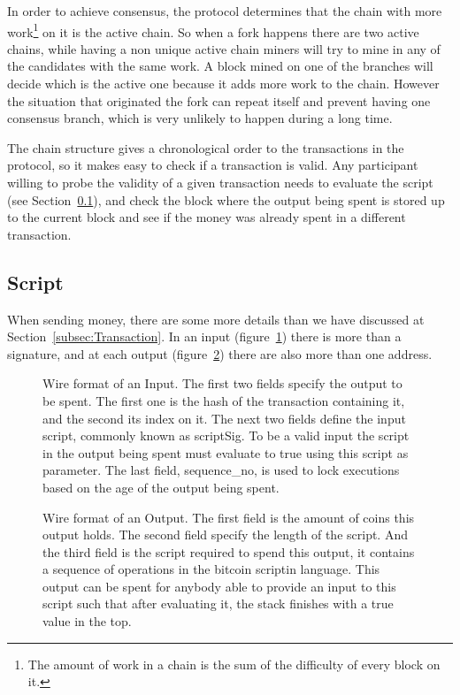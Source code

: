 In order to achieve consensus, the protocol determines that the chain with
  more work\footnote{The amount of work in a chain is the sum of the difficulty
  of every block on it.} on it is the active chain.
So when a fork happens there are two active chains, while having a non unique
  active chain miners will try to mine in any of the candidates with the same
  work.
A block mined on one of the branches will decide which is the active one
  because it adds more work to the chain. However the situation that originated
  the fork can repeat itself and prevent having one consensus branch, which is
  very unlikely \cite{decker2013information} to happen during a long time.

The chain structure gives a chronological order to the transactions in the
  protocol, so it makes easy to check if a transaction is valid.
Any participant willing to probe the validity of a given transaction needs
  to evaluate the script (see Section~\ref{subsec:script}), and  check the block
  where the output being spent is stored up to the current block and see if the
  money was already spent in a different transaction.

  \subsection{Script} \label{subsec:script}

When sending money, there are some more details than we have discussed at
  Section~\ref{subsec:Transaction}. In an input (figure~\ref{fig:input}) there
  is more than a signature, and at each output (figure~\ref{fig:output}) there
  are also more than one address.

\begin{figure}[ht]
  \centering
  
  \caption{Wire format of an Input.
             The first two fields specify the output to be spent.
             The first one is the hash of the transaction containing it, and the
               second its index on it.
             The next two fields define the input script, commonly known as
               scriptSig.
             To be a valid input the script in the output being spent must
               evaluate to true using this script as parameter.
             The last field, sequence\_no, is used to lock executions based on
             the age of the output being spent.
         }
  \label{fig:input}
\end{figure}

\begin{figure}[ht]
  \centering
  
  \caption{Wire format of an Output.
           The first field is the amount of coins this output holds.
           The second field specify the length of the script.
           And the third field is the script required to spend this output,
             it contains a sequence of operations in the bitcoin scriptin
             language.
           This output can be spent for anybody able to provide an input to this
             script such that after evaluating it, the stack finishes with a
             true value in the top.
             }
  \label{fig:output}
\end{figure}

